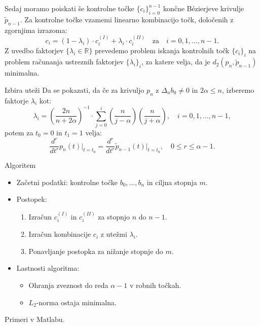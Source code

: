 \documentclass{beamer}
\begin{document}
\begin{frame}
  Sedaj moramo poiskati še kontrolne točke $\{c_i\}_{i=0}^{n-1}$ končne Bézierjeve krivulje $\tilde{p}_{n-1}$.
  Za kontrolne točke vzamemi linearno kombinacijo točk, določenih z zgornjima izrazoma:
  \[ c_i = (1 - \lambda_i) \cdot c_i^{(I)} + \lambda_i \cdot c_i^{(II)} \quad \text{za} \quad i = 0, 1, \ldots, n - 1. \]
  Z uvedbo faktorjev $\{\lambda_i \in \mathbb{R}\}$ prevedemo problem iskanja kontrolnih točk $\{c_i\}_i$ na problem računanja ustreznih faktorjev $\{\lambda_i\}_i$, za katere velja, da je $d_2(p_n, \tilde{p}_{n-1})$ minimalna.
\end{frame}

\begin{frame}{Izbira uteži}
   Da se pokazati, da če za krivuljo $p_n$ z $\Delta_n b_0 \neq 0$ in $2\alpha \leq n$, izberemo faktorje $\lambda_i$ kot: 
    \[
    \lambda_i = \left( \frac{2n}{n + 2\alpha} \right)^{-1} \cdot \sum_{j=0}^i \left( \frac{n}{j - \alpha} \right) \left( \frac{n}{j + \alpha} \right), \quad i = 0, 1, \ldots, n - 1,
    \]
    potem za $t_0 = 0$ in $t_1 = 1$ velja:
    \[
    \frac{d^r}{dt^r} p_n(t) \bigg|_{t=t_0} = \frac{d^r}{dt^r} \tilde{p}_{n-1}(t) \bigg|_{t=t_0}, \quad 0 \leq r \leq \alpha - 1.
    \]
\end{frame}

\begin{frame}{Algoritem}
    \begin{itemize}
        \item Začetni podatki: kontrolne točke $b_0, \ldots, b_n$ in ciljna stopnja $m$.
        \item Postopek:
        \begin{enumerate}
            \item Izračun $c_i^{(I)}$ in $c_i^{(II)}$ za stopnjo $n$ do $n-1$.
            \item Izračun kombinacije $c_i$ z utežmi $\lambda_i$.
            \item Ponavljanje postopka za nižanje stopnje do $m$.
        \end{enumerate}
        \item Lastnosti algoritma:
        \begin{itemize}
            \item Ohranja zveznost do reda $\alpha-1$ v robnih točkah.
            \item $L_2$-norma ostaja minimalna.
        \end{itemize}
    \end{itemize}
\end{frame}

\begin{frame}
  Primeri v Matlabu.
\end{frame}
\end{document}
